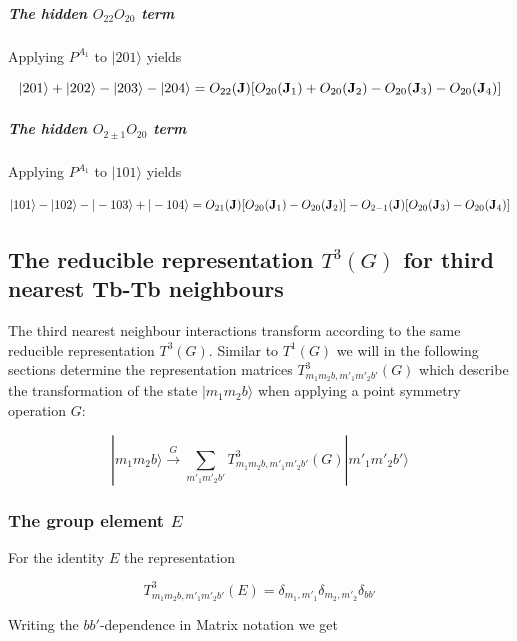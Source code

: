 \subparagraph{The hidden $O_{22}O_{20}$ term}

Applying $P^{A_1}$ to $|201\rangle$ yields 

\begin{equation}
|201\rangle+|202\rangle-|203\rangle-|204\rangle =
O_{22}(\mathbf J)[O_{20}(\mathbf J_1)+O_{20}(\mathbf J_2)-O_{20}(\mathbf J_3)-O_{20}(\mathbf J_4)]
\end{equation}


\subparagraph{The hidden $O_{2\pm1}O_{20}$ term}

Applying $P^{A_1}$ to $|101\rangle$ yields 

\begin{equation}
|101\rangle-|102\rangle -|-103\rangle+|-104\rangle =
O_{21}(\mathbf J)[O_{20}(\mathbf J_1)-O_{20}(\mathbf J_2)]-
O_{2-1}(\mathbf J)[O_{20}(\mathbf J_3)-O_{20}(\mathbf J_4)]
\end{equation}

\subsection{The reducible representation $T^3(G)$ for third nearest Tb-Tb neighbours}

The third nearest neighbour interactions transform according to the
same reducible representation $T^3(G)$. Similar to $T^1(G)$
we will in the following sections determine the representation matrices 
$T^3_{m_1m_2b,m'_1m'_2b'}(G)$ which describe the transformation
of the state $|m_1m_2b\rangle$ when applying a point symmetry 
operation $G$:

\begin{equation}
|m_1m_2b\rangle \stackrel{G}{\rightarrow} \sum_{m'_1m'_2b'} T^3_{m_1m_2b,m'_1m'_2b'}(G)|m'_1m'_2b'\rangle
\end{equation}

\subsubsection{The group element $E$}
 
For the identity $E$ the representation 

\begin{equation}
T^3_{m_1m_2b,m'_1m'_2b'}(E)=\delta_{m_1,m'_1}\delta_{m_2,m'_2}\delta_{bb'}
\end{equation}

Writing the $bb'$-dependence in Matrix notation we get

